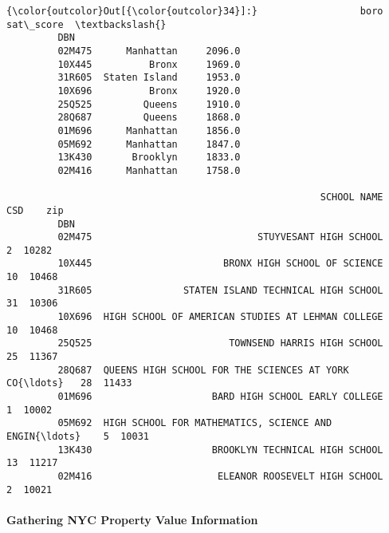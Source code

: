 \documentclass[11pt]{article}
\begin{document}
\begin{Verbatim}[commandchars=\\\{\}]
{\color{outcolor}Out[{\color{outcolor}34}]:}                  boro  sat\_score  \textbackslash{}
         DBN                                
         02M475      Manhattan     2096.0   
         10X445          Bronx     1969.0   
         31R605  Staten Island     1953.0   
         10X696          Bronx     1920.0   
         25Q525         Queens     1910.0   
         28Q687         Queens     1868.0   
         01M696      Manhattan     1856.0   
         05M692      Manhattan     1847.0   
         13K430       Brooklyn     1833.0   
         02M416      Manhattan     1758.0   
         
                                                       SCHOOL NAME  CSD    zip  
         DBN                                                                    
         02M475                             STUYVESANT HIGH SCHOOL    2  10282  
         10X445                       BRONX HIGH SCHOOL OF SCIENCE   10  10468  
         31R605                STATEN ISLAND TECHNICAL HIGH SCHOOL   31  10306  
         10X696  HIGH SCHOOL OF AMERICAN STUDIES AT LEHMAN COLLEGE   10  10468  
         25Q525                        TOWNSEND HARRIS HIGH SCHOOL   25  11367  
         28Q687  QUEENS HIGH SCHOOL FOR THE SCIENCES AT YORK CO{\ldots}   28  11433  
         01M696                     BARD HIGH SCHOOL EARLY COLLEGE    1  10002  
         05M692  HIGH SCHOOL FOR MATHEMATICS, SCIENCE AND ENGIN{\ldots}    5  10031  
         13K430                     BROOKLYN TECHNICAL HIGH SCHOOL   13  11217  
         02M416                      ELEANOR ROOSEVELT HIGH SCHOOL    2  10021  
\end{Verbatim}
            
    \paragraph{Gathering NYC Property Value
Information}\label{gathering-nyc-property-value-information}
\end{document}
